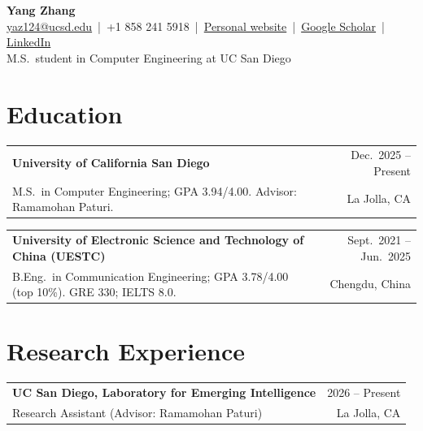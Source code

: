 \documentclass[10pt,letterpaper]{article}
\makeatletter
\newcommand{\entry}[4]{%
  \begin{tabularx}{\linewidth}{@{}X r@{}}
    \textbf{#1} & #2 \\
    #3 & #4 \\
  \end{tabularx}\par}
\makeatother
\begin{document}
\begin{center}
  {\LARGE\bfseries Yang Zhang}\\[3pt]
  \href{mailto:yaz124@ucsd.edu}{yaz124@ucsd.edu} \,|\,
  +1 858 241 5918 \,|\,
  \href{https://zzzz1991zzzz.github.io/Personal-Webpage/}{Personal website} \,|\,
  \href{https://scholar.google.com/citations?user=IVB_6X4AAAAJ&hl=en}{Google Scholar} \,|\,
  \href{https://www.linkedin.com/in/yang-zhang-8b2181442/}{LinkedIn}\\[2pt]
  M.S.\ student in Computer Engineering at UC San Diego
\end{center}

\section{Education}
\entry{University of California San Diego}{Dec.\ 2025 -- Present}
      {M.S.\ in Computer Engineering; GPA 3.94/4.00. Advisor: Ramamohan Paturi.}{La Jolla, CA}
\vspace{2pt}
\entry{University of Electronic Science and Technology of China (UESTC)}{Sept.\ 2021 -- Jun.\ 2025}
      {B.Eng.\ in Communication Engineering; GPA 3.78/4.00 (top 10\%). GRE 330; IELTS 8.0.}{Chengdu, China}

\section{Research Experience}
\entry{UC San Diego, Laboratory for Emerging Intelligence}{2026 -- Present}
      {Research Assistant (Advisor: Ramamohan Paturi)}{La Jolla, CA}
\end{document}
